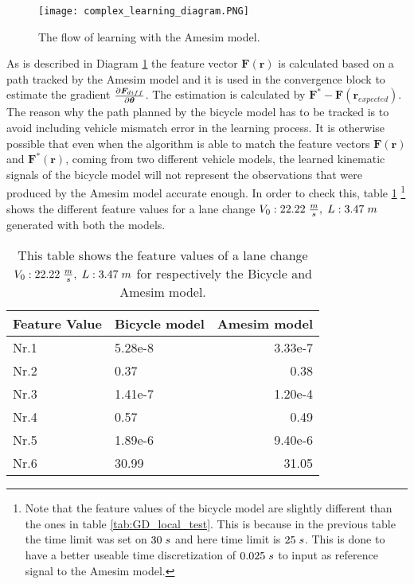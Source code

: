 \begin{figure}[h!]
	\centering
	\texttt{[image: complex\_learning\_diagram.PNG]}
	\caption{The flow of learning with the Amesim model.}	
	\label{fig:complex_learning} 
\end{figure}

As is described in Diagram \ref{fig:complex_learning} the feature vector $\bm{F}(\bm{r})$ is calculated based on a path tracked by the Amesim model and it is used in the convergence block to estimate the gradient $\pdv{\bm{F}_{diff}}{\bm{\theta}}$. The estimation is calculated by $\bm{F}^* - \bm{F}(\bm{r}_{expected})$. The reason why the path planned by the bicycle model has to be tracked is to avoid including vehicle mismatch error in the learning process. It is otherwise possible that even when the algorithm is able to match the feature vectors $\bm{F}(\bm{r})$ and  $\bm{F}^*(\bm{r})$, coming from two different vehicle models, the learned kinematic signals of the bicycle model will not represent the observations that were produced by the Amesim model accurate enough. In order to check this, table \ref{tab:comparinson_models} \footnote{Note that the feature values of the bicycle model are slightly different than the ones in table \ref{tab:GD_local_test}. This is because in the previous table the time limit was set on $30 \hspace{1mm}s$ and here time limit is $25 \hspace{1mm}s$. This is done to have a better useable time discretization of $0.025\hspace{1mm}s$ to input as reference signal to the Amesim model.} shows the different feature values for a lane change $V_0:22.22\hspace{1mm}\frac{m}{s},\hspace{1mm} L:3.47\hspace{1mm}m$ generated with both the models.\\


\begin{table}[h!]
	\centering
	\begin{tabular}{@{}llr@{}} \toprule
		\textbf{Feature Value}    & Bicycle model & Amesim model\\ \midrule
		Nr.1       		 & 5.28e-8    & 3.33e-7 \\
		Nr.2       		 & 0.37       & 0.38  \\
		Nr.3       		 & 1.41e-7    & 1.20e-4 \\
		Nr.4       		 & 0.57       & 0.49  \\
		Nr.5       		 & 1.89e-6    & 9.40e-6 \\
		Nr.6       		 & 30.99      & 31.05\\ \bottomrule
	\end{tabular}
	\caption{This table shows the feature values of a lane change $V_0:22.22\hspace{1mm}\frac{m}{s},\hspace{1mm} L:3.47\hspace{1mm}m$ for respectively the Bicycle and Amesim model.}
	\label{tab:comparinson_models}
\end{table}

